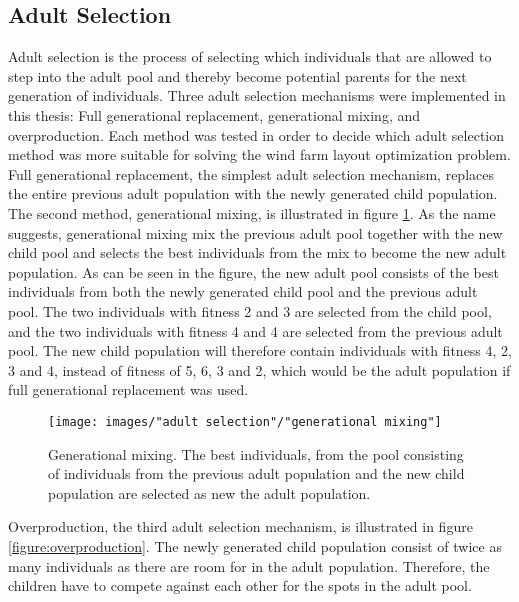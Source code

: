 \subsection{Adult Selection}\label{subsection:adult selection}
Adult selection is the process of selecting which individuals that are allowed to step into the adult pool and thereby become potential parents for the next generation of individuals. Three adult selection mechanisms were implemented in this thesis: Full generational replacement,  generational mixing, and overproduction. Each method was tested in order to decide which adult selection method was more suitable for solving the wind farm layout optimization problem. \\

\noindent Full generational replacement, the simplest adult selection mechanism, replaces the entire previous adult population with the newly generated child population. The second method, generational mixing, is illustrated in figure \ref{figure:generational mixing}. As the name suggests, generational mixing mix the previous adult pool together with the new child pool and selects the best individuals from the mix to become the new adult population. As can be seen in the figure, the new adult pool consists of the best individuals from both the newly generated child pool and the previous adult pool. The two individuals with fitness 2 and 3 are selected from the child pool, and the two individuals with fitness 4 and 4 are selected from the previous adult pool. The new child population will therefore contain individuals with fitness 4, 2, 3 and 4, instead of fitness of 5, 6, 3 and 2, which would be the adult population if full generational replacement was used. \\


\begin{figure}[h!]
\begin{center}
\texttt{[image: images/"adult selection"/"generational mixing"]}
\caption{Generational mixing. The best individuals, from the pool consisting of individuals from the previous adult population and the new child population are selected as new the adult population.}
\label{figure:generational mixing}
\end{center}
\end{figure}


\noindent Overproduction, the third adult selection mechanism, is illustrated in figure \ref{figure:overproduction}. The newly generated child population consist of twice as many individuals as there are room for in the adult population. Therefore, the children have to compete against each other for the spots in the adult pool. \\


